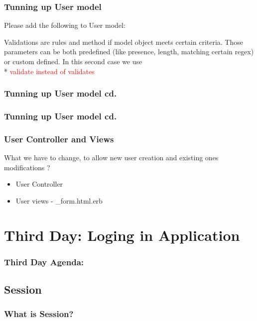 \documentclass{beamer}
\theoremstyle{mystyle}
\begin{document}
    \begin{frame}
      \frametitle{Tunning up User model}
      Please add the following to User model:
      \railsusermodelI 
      \begin{definition}
        Validations are rules and method if model object meets certain criteria.
        Those parameters can be both predefined (like presence, length, matching
        certain regex) or custom defined. In this second case we use \\*
        \textcolor{red}{validate instead of validates}
      \end{definition}
    \end{frame}
    
    \begin{frame}
      \frametitle{Tunning up User model cd.}
      \railsusermodelII
    \end{frame}
    
    \begin{frame}
      \frametitle{Tunning up User model cd.}
      \railsusermodelIII

    \end{frame}
    
    \begin{frame}
      \frametitle{User Controller and Views}
      What we have to change, to allow new user creation and existing ones
      modifications ?
      \begin{itemize}
      \item User Controller
        \railsusercontroller
      \item User views - \_form.html.erb
        \railsuserviewform
      \end{itemize}
      
    \end{frame}

\section{Third Day: Loging in Application}
    \begin{frame}
      \frametitle{Third Day Agenda:}
      \tableofcontents
      [
      currentsection,
      sectionstyle=hide/hide,
      subsectionstyle=show/show/hide
      ]
    \end{frame}
  \subsection{Session}
    \begin{frame}
      \frametitle{What is Session?}
    \end{frame}
\end{document}
